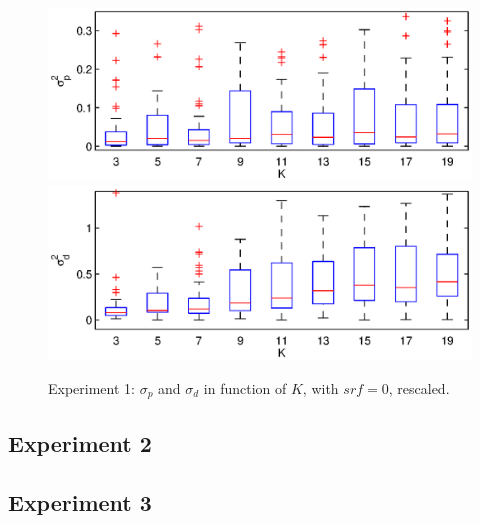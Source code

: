 \documentclass[letterpaper, 10 pt, conference]{ieeeconf}  %
\begin{document}
\begin{figure}[ht!]
\centering
\includegraphics[width=1\columnwidth]{set1-sp-nosrf-ylim.eps}
\includegraphics[width=1\columnwidth]{set1-sd-nosrf-ylim.eps}
\caption{\label{fig:set1-rescaled}Experiment 1: $\sigma_p$ and $\sigma_d$ in function of $K$, with $srf=0$, rescaled.}
\end{figure}

\subsection{Experiment 2}

\subsection{Experiment 3}
\end{document}
